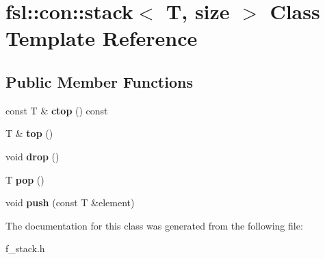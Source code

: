 \hypertarget{classfsl_1_1con_1_1stack}{}\section{fsl\+::con\+::stack$<$ T, size $>$ Class Template Reference}
\label{classfsl_1_1con_1_1stack}
\subsection*{Public Member Functions}
\begin{DoxyCompactItemize}
\item 
\mbox{\label{classfsl_1_1con_1_1stack_a0fb16a00176c677dbbde3a6ad3de5e0e}} 
const T \& {\bfseries ctop} () const
\item 
\mbox{\label{classfsl_1_1con_1_1stack_adc95c17e6cd90c04e7cc515108733123}} 
T \& {\bfseries top} ()
\item 
\mbox{\label{classfsl_1_1con_1_1stack_a6f9652e3d7503aacd3e9b61c5c149dd5}} 
void {\bfseries drop} ()
\item 
\mbox{\label{classfsl_1_1con_1_1stack_a307b13ba023ef8df0ae17425f4efd64e}} 
T {\bfseries pop} ()
\item 
\mbox{\label{classfsl_1_1con_1_1stack_ad5ffaa64335ba5c03e28711333dc3bee}} 
void {\bfseries push} (const T \&element)
\end{DoxyCompactItemize}


The documentation for this class was generated from the following file\+:\begin{DoxyCompactItemize}
\item 
f\+\_\+stack.\+h\end{DoxyCompactItemize}
